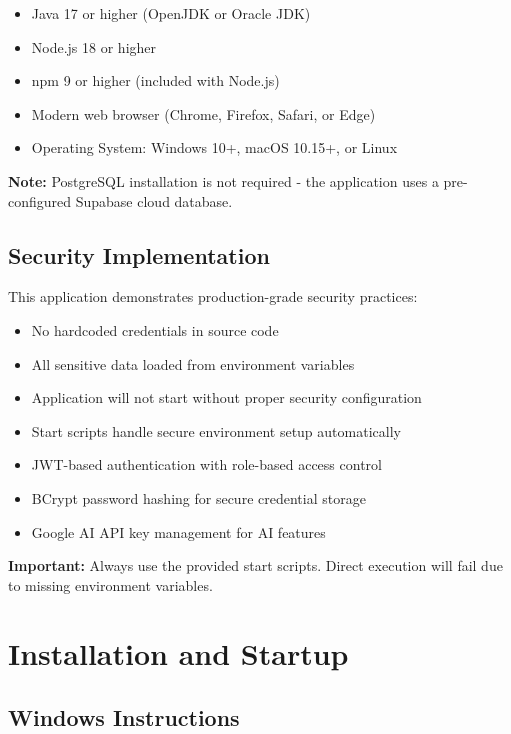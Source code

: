 \documentclass[11pt,a4paper]{article}
\begin{document}
\begin{itemize}[leftmargin=*]
    \item Java 17 or higher (OpenJDK or Oracle JDK)
    \item Node.js 18 or higher
    \item npm 9 or higher (included with Node.js)
    \item Modern web browser (Chrome, Firefox, Safari, or Edge)
    \item Operating System: Windows 10+, macOS 10.15+, or Linux
\end{itemize}

\textbf{Note:} PostgreSQL installation is not required - the application uses a pre-configured Supabase cloud database.

\subsection{Security Implementation}

This application demonstrates production-grade security practices:

\begin{itemize}[leftmargin=*]
    \item No hardcoded credentials in source code
    \item All sensitive data loaded from environment variables
    \item Application will not start without proper security configuration
    \item Start scripts handle secure environment setup automatically
    \item JWT-based authentication with role-based access control
    \item BCrypt password hashing for secure credential storage
    \item Google AI API key management for AI features
\end{itemize}

\textbf{Important:} Always use the provided start scripts. Direct execution will fail due to missing environment variables.

\section{Installation and Startup}

\subsection{Windows Instructions}
\end{document}
